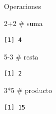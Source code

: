 \documentclass[
  ignorenonframetext,
  aspectratio=169,
  spanish,
]{beamer}
\newenvironment{Shaded}{\begin{snugshade}}{\end{snugshade}}
\newcommand{\CommentTok}[1]{\textcolor[rgb]{0.37,0.37,0.37}{#1}}
\newcommand{\DecValTok}[1]{\textcolor[rgb]{0.68,0.00,0.00}{#1}}
\newcommand{\SpecialCharTok}[1]{\textcolor[rgb]{0.37,0.37,0.37}{#1}}
\begin{document}
\begin{frame}[fragile]{Operaciones}
\label{operaciones}
\begin{Shaded}
\begin{Highlighting}[]
\DecValTok{2}\SpecialCharTok{+}\DecValTok{2} \CommentTok{\# suma}
\end{Highlighting}
\end{Shaded}

\begin{verbatim}
[1] 4
\end{verbatim}

\begin{Shaded}
\begin{Highlighting}[]
\DecValTok{5{-}3} \CommentTok{\# resta }
\end{Highlighting}
\end{Shaded}

\begin{verbatim}
[1] 2
\end{verbatim}

\begin{Shaded}
\begin{Highlighting}[]
\DecValTok{3}\SpecialCharTok{*}\DecValTok{5} \CommentTok{\# producto}
\end{Highlighting}
\end{Shaded}

\begin{verbatim}
[1] 15
\end{verbatim}
\end{frame}
\end{document}
